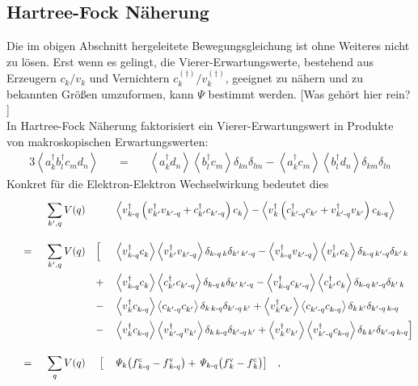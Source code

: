 \documentclass[a4paper,11pt]{article}
\newcommand{\ind}[2]{{_{#1}^{#2}}}
\newcommand{\+}{\dagger}
\newcommand{\bra}{\left \langle}
\newcommand{\ket}{\right \rangle}
\newcommand{\HF}[9]{ \bra #1 #4 \ket\bra #2 #3\ket \delta_{#5\,#8}\delta_{#6\,#7} #9 \bra #1 #3 \ket\bra #2 #4\ket \delta_{#5\, #7}\delta_{#6\, #8}}
\renewcommand{\^}{\hat}
\renewcommand{\tt}{\text}
\renewcommand{\~}{\widetilde}
\begin{document}
\subsection{Hartree-Fock Näherung}
Die im obigen Abschnitt hergeleitete Bewegungsgleichung ist ohne Weiteres nicht zu lösen. Erst wenn es gelingt, die Vierer-Erwartungswerte, bestehend aus Erzeugern $c\ind{k}{}/v\ind{k}{}$ und Vernichtern $c\ind{k}{(\+)}/v\ind{k}{(\+)}$, geeignet zu nähern und zu bekannten Größen umzuformen, kann $\mathit{\Psi}$ bestimmt werden. [Was gehört hier rein? ]\\
In Hartree-Fock Näherung faktorisiert ein Vierer-Erwartungswert in Produkte von makroskopischen Erwartungswerten: 
\begin{alignat*}{3}
\bra a\ind{k}{\+}b\ind{l}{\+}c\ind{m}{}d\ind{n}{} \ket 
&& \ = \ &&  		\bra 		a\ind{k}{\+}d\ind{n}{}			\ket		\bra 		b\ind{l}{\+}c\ind{m}{}			\ket \delta_{kn}\delta_{lm}
- 							\bra 		a\ind{k}{\+}c\ind{m}{}		\ket		\bra 		b\ind{l}{\+} d\ind{n}{}		\ket \delta_{km}\delta_{ln}				%
\end{alignat*}
Konkret für die Elektron-Elektron Wechselwirkung bedeutet dies 
\begin{alignat*}{5}
& && &&  \sum_{k',q}^{} V(q) && &&		\bra  v\ind{k\tt -q}{\+}\left (v\ind{k'}{\+}v\ind{k'\tt -q}{}+c\ind{k'}{\+}c\ind{k'\tt-q}{}\right )c\ind{k}{} 		\ket  
-  	 					\bra  v\ind{k}{\+}\left (c\ind{k'\tt -q}{\+}c\ind{k'}{}+v\ind{k'\tt-q}{\+}v\ind{k'}{}\right )c\ind{k\tt -q}{}		\ket  \\[8pt]
%
%
& && \ =\ && \sum_{k',q}^{} V(q)  &&\Big[	  &&   \HF	{   v\ind{k\tt -q}{\+}   } {   v\ind{k'}{\+}   } {   v\ind{k'\tt-q}{}  } {  c\ind{k}{}  } {k\tt -q}  {k'}  {k'\tt-q}  {k} {-}\\
& &&  && && + && 	  	 \HF{   v\ind{k\tt -q}{\+}   } {   c\ind{k'}{\+}   } {   c\ind{k'\tt-q}{}  } {  c\ind{k}{}  } {k\tt -q}  {k'}  {k'\tt-q}  {k} {-} \\[1pt]
& &&  && && - && 	  	\HF{   v\ind{k}{\+}	    	} {   c\ind{k'\tt-q}{}  }  {   c\ind{k'}{} 		 } {  c\ind{k\tt -q}{}  } {k}  {k'\tt-q}  {k'}  {k\tt-q} {+} \\[1pt]
& &&  && && - && 	  	\HF{   v\ind{k}{\+}	    	} {   v\ind{k'\tt-q}{\+}  }  {   v\ind{k'}{} 		 } {  c\ind{k\tt -q}{}  } {k}  {k'\tt-q}  {k'}  {k\tt-q} {+} \Big] \\[8pt]
%
%
& && \ =\ &&  \sum_{q}^{} V(q)&&\ \big[ && \mathit{\Psi}_{k}\big(f\ind{k\tt-q}{\tt c}-f\ind{k\tt-q}{\tt v}\big) +\mathit{\Psi}_{k\tt-q}\big(f\ind{k}{\tt v}-f\ind{k}{\tt c}\big)\big]\quad , 
\end{alignat*}
\end{document}
